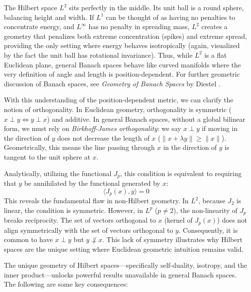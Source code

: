\documentclass{article}
\begin{document}
The Hilbert space $L^2$ sits perfectly in the middle. Its unit ball is a round sphere, balancing height and
width. If $L^1$ can be thought of as having no penalties to concentrate energy, and $L^\infty$ has no penalty
in spreading mass, $L^2$ creates a geometry that penalizes both extreme concentration (spikes) and extreme
spread, providing the only setting where energy behaves isotropically (again, visualized by the fact the unit
ball has rotational invariance). Thus, while $L^2$ is a flat Euclidean plane, general Banach spaces behave
like curved manifolds where the very definition of angle and length is position-dependent. For further
geometric discussion of Banach spaces, see \emph{Geometry of Banach Spaces} by Diestel
\cite{diestelGeometryBanachSpacesSelected1975}.

With this understanding of the position-dependent metric, we can clarify the notion of orthogonality.
In Euclidean geometry, orthogonality is symmetric ($x \perp y \iff y \perp x$) and additive. In
general Banach spaces, without a global bilinear form, we must rely on \emph{Birkhoff-James orthogonality}: we say $x \perp y$ if moving in the direction of $y$ does not decrease the length of $x$ ($\|x + \lambda y\| \ge \|x\|$). Geometrically, this means the line passing through $x$ in the direction of $y$ is tangent to the unit sphere at $x$.

Analytically, utilizing the functional $J_p$, this condition is equivalent to requiring that $y$ be annihilated by the functional generated by $x$:
\[
	\langle J_p(x), y \rangle = 0
\]
This reveals the fundamental flaw in non-Hilbert geometry. In $L^2$, because $J_2$ is linear, the condition is symmetric. However, in $L^p$ ($p \ne 2$), the non-linearity of $J_p$ breaks reciprocity. The set of vectors orthogonal to $x$ (kernel of $J_p(x)$) does not align symmetrically with the set of vectors orthogonal to $y$. Consequently, it is common to have $x \perp y$ but $y \not\perp x$. This lack of symmetry illustrates why Hilbert spaces are the unique setting where Euclidean geometric intuition remains valid.

The unique geometry of Hilbert spaces---specifically self-duality, isotropy, and the inner product---unlocks
powerful results unavailable in general Banach spaces. The following are some key consequences:
\end{document}
